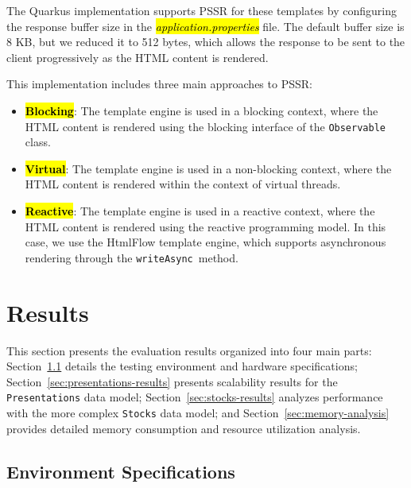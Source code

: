\documentclass[software,article,accept,pdftex,moreauthors]{Definitions/mdpi}
\begin{document}
The Quarkus implementation supports PSSR for these templates by configuring the
response buffer size in the \textit{\hl{application.properties}} file. The default
buffer size is 8 KB, but we reduced it to 512 bytes, which allows the response
to be sent to the client progressively as the HTML content is rendered.

This implementation includes three main approaches to PSSR\@:
\begin{itemize}
      \item \textbf{\hl{Blocking}}: The template engine is used in a blocking context,
            where the HTML content is rendered using the blocking interface of the
            \texttt{Observable} class.
      \item \textbf{\hl{Virtual}}: The template engine is used in a non-blocking context,
            where the HTML content is rendered within the context of virtual threads.
      \item \textbf{\hl{Reactive}}: The template engine is used in a reactive context,
            where the HTML content is rendered using the reactive programming model.
            In this case, we use the HtmlFlow template engine, which
            supports asynchronous rendering through the \texttt{writeAsync}~method.
\end{itemize}


\section{Results}\label{s5}

This section presents the evaluation results organized into four main parts:
Section~\ref{sec:environment} details the testing environment and hardware
specifications; Section~\ref{sec:presentations-results} presents scalability
results for the \texttt{Presentations} data model;
Section~\ref{sec:stocks-results} analyzes performance with the more complex
\texttt{Stocks} data model; and Section~\ref{sec:memory-analysis} provides
detailed memory consumption and resource utilization analysis.

\subsection{Environment Specifications}
\label{sec:environment}
\end{document}
